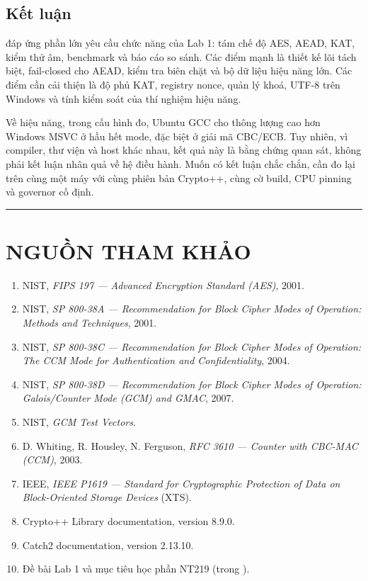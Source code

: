 \documentclass[12pt,a4paper,oneside]{report}
\let\origtexttt\texttt
\renewcommand{\texttt}[1]{\origtexttt{\seqsplit{#1}}}
\begin{document}
\section{Kết luận}


\texttt{aestool} đáp ứng phần lớn yêu cầu chức năng của Lab 1: tám chế độ AES, AEAD, KAT, kiểm thử âm, benchmark và báo cáo so sánh. Các điểm mạnh là thiết kế lõi tách biệt, fail-closed cho AEAD, kiểm tra biên chặt và bộ dữ liệu hiệu năng lớn. Các điểm cần cải thiện là độ phủ KAT, registry nonce, quản lý khoá, UTF-8 trên Windows và tính kiểm soát của thí nghiệm hiệu năng.


Về hiệu năng, trong cấu hình đo, Ubuntu GCC cho thông lượng cao hơn Windows MSVC ở hầu hết mode, đặc biệt ở giải mã CBC/ECB. Tuy nhiên, vì compiler, thư viện và host khác nhau, kết quả này là bằng chứng quan sát, không phải kết luận nhân quả về hệ điều hành. Muốn có kết luận chắc chắn, cần đo lại trên cùng một máy với cùng phiên bản Crypto++, cùng cờ build, CPU pinning và governor cố định.


\par\noindent\rule{\textwidth}{0.4pt}


\chapter{NGUỒN THAM KHẢO}


\begin{enumerate}[leftmargin=*]
\item NIST, \emph{FIPS 197 — Advanced Encryption Standard (AES)}, 2001.
\item NIST, \emph{SP 800-38A — Recommendation for Block Cipher Modes of Operation: Methods and Techniques}, 2001.
\item NIST, \emph{SP 800-38C — Recommendation for Block Cipher Modes of Operation: The CCM Mode for Authentication and Confidentiality}, 2004.
\item NIST, \emph{SP 800-38D — Recommendation for Block Cipher Modes of Operation: Galois/Counter Mode (GCM) and GMAC}, 2007.
\item NIST, \emph{GCM Test Vectors}.
\item D. Whiting, R. Housley, N. Ferguson, \emph{RFC 3610 — Counter with CBC-MAC (CCM)}, 2003.
\item IEEE, \emph{IEEE P1619 — Standard for Cryptographic Protection of Data on Block-Oriented Storage Devices} (XTS).
\item Crypto++ Library documentation, version 8.9.0.
\item Catch2 documentation, version 2.13.10.
\item Đề bài Lab 1 và mục tiêu học phần NT219 (trong \texttt{docs/}).
\end{enumerate}
\end{document}

